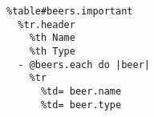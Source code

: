 \begin{verbatim}
%table#beers.important
  %tr.header
    %th Name
    %th Type
  - @beers.each do |beer|
    %tr
      %td= beer.name
      %td= beer.type
\end{verbatim}
